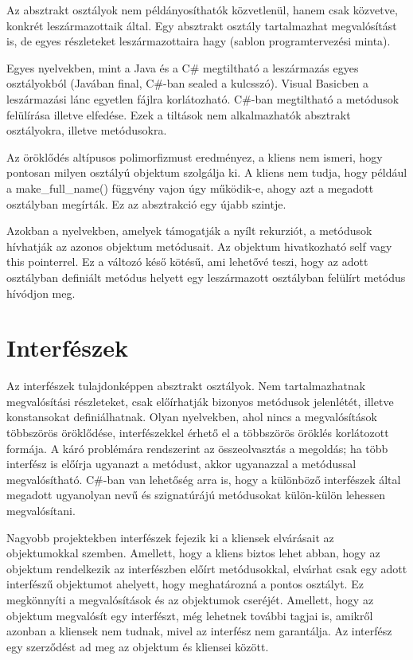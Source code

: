 \documentclass[]{thesis-ekf}
\theoremstyle{definition}
\begin{document}
	Az absztrakt osztályok nem példányosíthatók közvetlenül, hanem csak közvetve, konkrét leszármazottaik által. Egy absztrakt osztály tartalmazhat megvalósítást is, de egyes részleteket leszármazottaira hagy (sablon programtervezési minta).
	
	Egyes nyelvekben, mint a Java és a C\# megtiltható a leszármazás egyes osztályokból (Javában final, C\#-ban sealed a kulcsszó). Visual Basicben a leszármazási lánc egyetlen fájlra korlátozható. C\#-ban megtiltható a metódusok felülírása illetve elfedése. Ezek a tiltások nem alkalmazhatók absztrakt osztályokra, illetve metódusokra.
	
	Az öröklődés altípusos polimorfizmust eredményez, a kliens nem ismeri, hogy pontosan milyen osztályú objektum szolgálja ki. A kliens nem tudja, hogy például a make\_full\_name() függvény vajon úgy működik-e, ahogy azt a megadott osztályban megírták. Ez az absztrakció egy újabb szintje.
	
	Azokban a nyelvekben, amelyek támogatják a nyílt rekurziót, a metódusok hívhatják az azonos objektum metódusait. Az objektum hivatkozható self vagy this pointerrel. Ez a változó késő kötésű, ami lehetővé teszi, hogy az adott osztályban definiált metódus helyett egy leszármazott osztályban felülírt metódus hívódjon meg.
	
	\section{Interfészek}
	Az interfészek tulajdonképpen absztrakt osztályok. Nem tartalmazhatnak megvalósítási részleteket, csak előírhatják bizonyos metódusok jelenlétét, illetve konstansokat definiálhatnak. Olyan nyelvekben, ahol nincs a megvalósítások többszörös öröklődése, interfészekkel érhető el a többszörös öröklés korlátozott formája. A káró problémára rendszerint az összeolvasztás a megoldás; ha több interfész is előírja ugyanazt a metódust, akkor ugyanazzal a metódussal megvalósítható. C\#-ban van lehetőség arra is, hogy a különböző interfészek által megadott ugyanolyan nevű és szignatúrájú metódusokat külön-külön lehessen megvalósítani.
	
	Nagyobb projektekben interfészek fejezik ki a kliensek elvárásait az objektumokkal szemben. Amellett, hogy a kliens biztos lehet abban, hogy az objektum rendelkezik az interfészben előírt metódusokkal, elvárhat csak egy adott interfészű objektumot ahelyett, hogy meghatározná a pontos osztályt. Ez megkönnyíti a megvalósítások és az objektumok cseréjét. Amellett, hogy az objektum megvalósít egy interfészt, még lehetnek további tagjai is, amikről azonban a kliensek nem tudnak, mivel az interfész nem garantálja. Az interfész egy szerződést ad meg az objektum és kliensei között.
	
\end{document}
